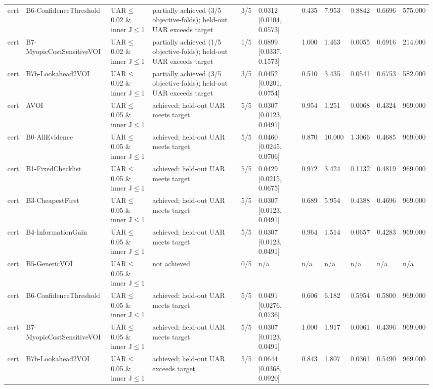 \begin{table}[!ht]
{\begin{tabular}{lllllllllll}
cert & B6-ConfidenceThreshold & UAR$\le$0.02 \& inner J$\le$1 & partially achieved (3/5 objective-folds); held-out UAR exceeds target & 3/5 & 0.0312 [0.0104, 0.0573] & 0.435 & 7.953 & 0.8842 & 0.6696 & 575.000 \\
cert & B7-MyopicCostSensitiveVOI & UAR$\le$0.02 \& inner J$\le$1 & partially achieved (1/5 objective-folds); held-out UAR exceeds target & 1/5 & 0.0899 [0.0337, 0.1573] & 1.000 & 1.463 & 0.0055 & 0.6916 & 214.000 \\
cert & B7b-Lookahead2VOI & UAR$\le$0.02 \& inner J$\le$1 & partially achieved (3/5 objective-folds); held-out UAR exceeds target & 3/5 & 0.0452 [0.0201, 0.0754] & 0.510 & 3.435 & 0.0541 & 0.6753 & 582.000 \\
cert & AVOI & UAR$\le$0.05 \& inner J$\le$1 & achieved; held-out UAR meets target & 5/5 & 0.0307 [0.0123, 0.0491] & 0.954 & 1.251 & 0.0068 & 0.4324 & 969.000 \\
cert & B0-AllEvidence & UAR$\le$0.05 \& inner J$\le$1 & achieved; held-out UAR meets target & 5/5 & 0.0460 [0.0245, 0.0706] & 0.870 & 10.000 & 1.3066 & 0.4685 & 969.000 \\
cert & B1-FixedChecklist & UAR$\le$0.05 \& inner J$\le$1 & achieved; held-out UAR meets target & 5/5 & 0.0429 [0.0215, 0.0675] & 0.972 & 3.424 & 0.1132 & 0.4819 & 969.000 \\
cert & B3-CheapestFirst & UAR$\le$0.05 \& inner J$\le$1 & achieved; held-out UAR meets target & 5/5 & 0.0307 [0.0123, 0.0491] & 0.689 & 5.954 & 0.4388 & 0.4696 & 969.000 \\
cert & B4-InformationGain & UAR$\le$0.05 \& inner J$\le$1 & achieved; held-out UAR meets target & 5/5 & 0.0307 [0.0123, 0.0491] & 0.964 & 1.514 & 0.0657 & 0.4283 & 969.000 \\
cert & B5-GenericVOI & UAR$\le$0.05 \& inner J$\le$1 & not achieved & 0/5 & n/a & n/a & n/a & n/a & n/a & n/a \\
cert & B6-ConfidenceThreshold & UAR$\le$0.05 \& inner J$\le$1 & achieved; held-out UAR meets target & 5/5 & 0.0491 [0.0276, 0.0736] & 0.606 & 6.182 & 0.5954 & 0.5800 & 969.000 \\
cert & B7-MyopicCostSensitiveVOI & UAR$\le$0.05 \& inner J$\le$1 & achieved; held-out UAR meets target & 5/5 & 0.0307 [0.0123, 0.0491] & 1.000 & 1.917 & 0.0061 & 0.4396 & 969.000 \\
cert & B7b-Lookahead2VOI & UAR$\le$0.05 \& inner J$\le$1 & achieved; held-out UAR exceeds target & 5/5 & 0.0644 [0.0368, 0.0920] & 0.843 & 1.807 & 0.0361 & 0.5490 & 969.000 \\
\bottomrule
\end{tabular}}
\end{table}
